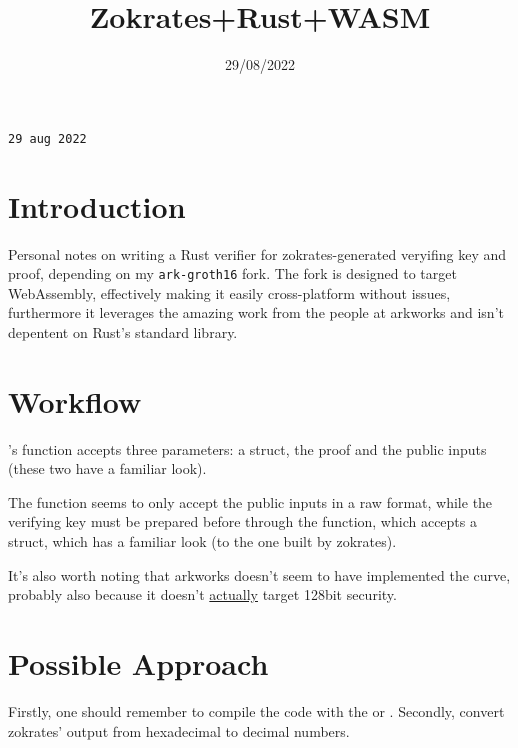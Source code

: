 \documentclass{article}
\title{Zokrates+Rust+WASM}
\date{29/08/2022}
\begin{document}
\maketitle

\texttt{29 aug 2022}

\section{Introduction}

Personal notes on writing a Rust verifier for zokrates-generated veryifing key and proof, depending on my \lstinline{ark-groth16} fork. The fork is designed to target WebAssembly, effectively making it easily cross-platform without issues, furthermore it leverages the amazing work from the people at arkworks and isn't depentent on Rust's standard library.

\section{Workflow}
's  function accepts three parameters: a  struct, the proof and the public inputs (these two have a familiar look).

The function seems to only accept the public inputs in a raw format, while the verifying key must be prepared before through the  function, which accepts a  struct, which has a familiar look (to the one built by zokrates).

It's also worth noting that arkworks doesn't seem to have implemented the  curve, probably also because it doesn't \href{https://moderncrypto.org/mail-archive/curves/2016/000740.html}{actually} target 128bit security.

\section{Possible Approach}
Firstly, one should remember to compile the  code with the  or . Secondly, convert zokrates' output from hexadecimal to decimal numbers.
\end{document}
